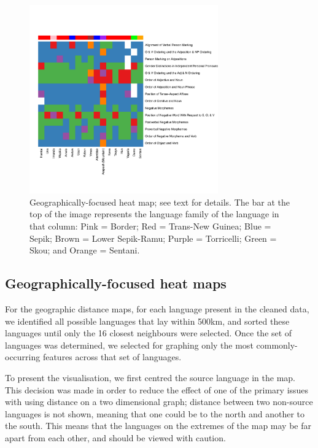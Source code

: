 \documentclass[11pt]{article}
\begin{document}
\begin{figure}[!t]
\includegraphics[width=3.2in]
{graph2yimassmall.pdf} 
\caption{Geographically-focused heat map; see text for details. The bar at the top of the image represents the language family of the language in that column: Pink = Border; Red = Trans-New Guinea; Blue = Sepik; Brown = Lower Sepik-Ramu; Purple = Torricelli; Green = Skou; and Orange = Sentani.} 
\label{fig:heat1} 
\end{figure}


\subsection{Geographically-focused heat maps}
For the geographic distance maps, for each language present in the cleaned data, we identified all possible languages that lay within 500km, and sorted these languages until only the 16 closest neighbours were selected. Once the set of languages was determined, we selected for graphing only the most commonly-occurring features across that set of languages.


To present the visualisation, we first centred the source language in the map. This decision was made in order to reduce the effect of one of the primary issues with using distance on a two dimensional graph; distance between two non-source languages is not shown, meaning that one could be to the north and another to the south. This means that the languages on the extremes of the map may be far apart from each other, and should be viewed with caution. %
\end{document}
